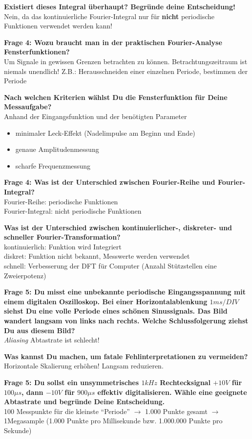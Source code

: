\documentclass[11pt,a4paper]{scrartcl}
\begin{document}
\textbf{Existiert dieses Integral überhaupt? Begründe deine Entscheidung!}\\
Nein, da das kontinuierliche Fourier-Integral nur für \textbf{nicht} periodische Funktionen verwendet werden kann!
\newpage

\textbf{Frage 4: Wozu braucht man in der praktischen Fourier-Analyse Fensterfunktionen?}\\
Um Signale in gewissen Grenzen betrachten zu können. Betrachtungszeitraum ist niemals unendlich! Z.B.: Herausschneiden einer einzelnen Periode, bestimmen der Periode

\textbf{Nach welchen Kriterien wählst Du die Fensterfunktion für Deine Messaufgabe?}\\
Anhand der Eingangsfunktion und der benötigten Parameter
\begin{itemize}
	\item minimaler Leck-Effekt (Nadelimpulse am Beginn und Ende)
	\item genaue Amplitudenmessung
	\item scharfe Frequenzmessung
\end{itemize}

\textbf{Frage 4: Was ist der Unterschied zwischen Fourier-Reihe und Fourier-Integral? }\\
Fourier-Reihe: periodische Funktionen\\
Fourier-Integral: nicht periodische Funktionen

\textbf{Was ist der Unterschied zwischen kontinuierlicher-, diskreter- und schneller Fourier-Transformation?}\\
kontinuierlich: Funktion wird Integriert\\
diskret: Funktion nicht bekannt, Messwerte werden verwendet\\
schnell: Verbesserung der DFT für Computer (Anzahl Stützstellen eine Zweierpotenz)

\textbf{Frage 5: Du misst eine unbekannte periodische Eingangsspannung mit einem digitalen Oszilloskop. Bei einer Horizontalablenkung $1ms/DIV$ siehst Du eine volle Periode eines schönen Sinussignals. Das Bild wandert langsam von links nach rechts. Welche Schlussfolgerung ziehst Du aus diesem Bild?}\\
\textit{Aliasing} Abtastrate ist schlecht!

\textbf{Was kannst Du machen, um fatale Fehlinterpretationen zu vermeiden?}\\
Horizontale Skalierung erhöhen! Langsam reduzieren.

\textbf{Frage 5: Du sollst ein unsymmetrisches $1kHz$ Rechtecksignal $+10V$ für $100\mu s$, dann $-10V$ für $900\mu s$ effektiv digitalisieren. Wähle eine geeignete Abtastrate und begründe Deine Entscheidung.}\\
100 Messpunkte für die kleinste "`Periode"' $\rightarrow$ 1.000 Punkte gesamt $\rightarrow$ 1Megasample (1.000 Punkte pro Millisekunde bzw. 1.000.000 Punkte pro Sekunde)
\newpage
\end{document}
